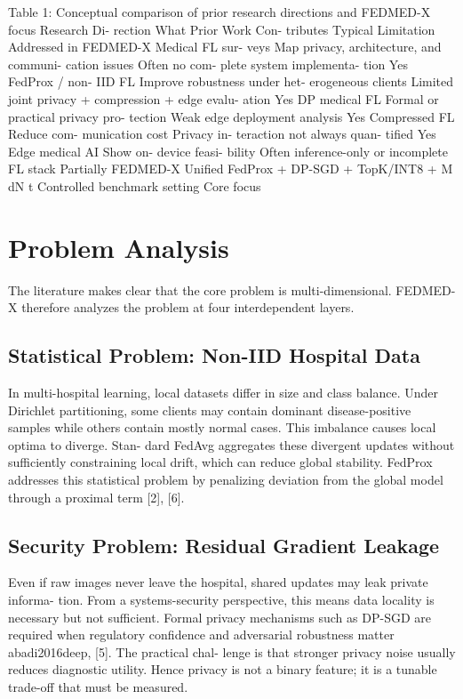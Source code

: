 Table 1: Conceptual comparison of prior research directions and FEDMED-X focus
Research
Di- rection
What Prior
Work
Con- tributes
Typical
Limitation
Addressed in FEDMED-X
Medical FL sur- veys
Map privacy, architecture, and communi- cation issues
Often no com- plete system implementa- tion
Yes
FedProx
/ non-
IID FL
Improve robustness under het- erogeneous clients
Limited joint privacy
+ compression
+ edge evalu- ation
Yes
DP medical FL
Formal or practical privacy pro- tection
Weak edge deployment analysis
Yes
Compressed FL
Reduce com- munication cost
Privacy in- teraction not always quan- tified
Yes
Edge medical AI
Show on- device feasi- bility
Often inference-only or incomplete
FL stack
Partially
FEDMED-X
Unified
FedProx
+
DP-SGD
+
TopK/INT8
+
M dN t
Controlled benchmark setting
Core focus

\section{Problem Analysis}
The literature makes clear that the core problem is multi-dimensional. FEDMED-X therefore analyzes the problem at four interdependent layers.
\subsection{Statistical Problem: Non-IID Hospital Data}
In multi-hospital learning, local datasets differ in size and class balance. Under Dirichlet partitioning, some clients may contain dominant disease-positive samples while others contain mostly normal cases. This imbalance causes local optima to diverge. Stan- dard FedAvg aggregates these divergent updates without sufficiently constraining local drift, which can reduce global stability. FedProx addresses this statistical problem by penalizing deviation from the global model through a proximal term [2], [6].
\subsection{Security Problem: Residual Gradient Leakage}
Even if raw images never leave the hospital, shared updates may leak private informa- tion. From a systems-security perspective, this means data locality is necessary but not sufficient. Formal privacy mechanisms such as DP-SGD are required when regulatory confidence and adversarial robustness matter abadi2016deep, [5]. The practical chal- lenge is that stronger privacy noise usually reduces diagnostic utility. Hence privacy is not a binary feature; it is a tunable trade-off that must be measured.
